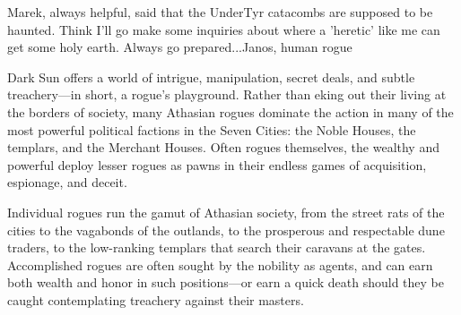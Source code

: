 {Marek, always helpful, said that the UnderTyr catacombs are supposed to be haunted. Think I'll go make some inquiries about where a 'heretic' like me can get some holy earth. Always go prepared...}{Janos, human rogue}

{\tableheader Dark Sun} offers a world of intrigue, manipulation, secret deals, and subtle treachery---in short, a rogue's playground. Rather than eking out their living at the
borders of society, many Athasian rogues dominate the action in many of the most powerful political factions in the Seven Cities: the Noble Houses, the templars, and the Merchant Houses. Often rogues themselves, the wealthy and powerful deploy lesser rogues as pawns in their endless games of acquisition, espionage, and deceit.

Individual rogues run the gamut of Athasian society, from the street rats of the cities to the vagabonds of the outlands, to the prosperous and respectable dune traders, to the low-ranking templars that search their caravans at the gates. Accomplished rogues are often sought by the nobility as agents, and can earn both wealth and honor in such positions---or earn a quick death should they be caught contemplating treachery against their masters.


